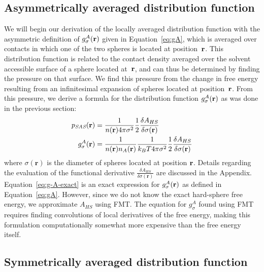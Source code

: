 \subsection{Asymmetrically averaged distribution function}\label{sec:g-A}

We will begin our derivation of the locally averaged distribution
function with the asymmetric definition of $g_\sigma^A(\textbf{r})$ given in
Equation~\ref{eq:gA}, which is averaged over contacts in which one of
the two spheres is located at position~$\textbf{r}$.  This distribution
function is related to the contact density averaged over the solvent accessible surface
of a sphere located at~$\textbf{r}$, and can thus be determined by finding
the pressure on that surface.  We find this pressure from the change in
free energy resulting from an infinitesimal expansion of spheres
located at position~$\textbf{r}$.  From this pressure, we derive a
formula for the distribution function $g_\sigma^A(\textbf{r})$ as was done in
the previous section:
\begin{align}
  p_{\textit{SAS}}(\mathbf{r}) &= \frac{1}{n(\rr) 4\pi \sigma^2}\frac12 \frac{\delta
    A_{HS}}{\delta \sigma(\mathbf{r})} \label{eq:p_{HS}^A}\\
  g_\sigma^A(\rr)%
  &= \frac{1}{n(\rr) n_A(\rr)}\frac{1}{ k_BT 4\pi \sigma^2}\frac12 \frac{\delta
    A_{HS}}{\delta \sigma(\mathbf{r})} \label{eq:g-A-exact}
\end{align}
where $\sigma(\mathbf{r})$ is the diameter of spheres located at position $\textbf{r}$.
Details regarding the evaluation of the functional derivative
$\frac{\delta A_{HS}}{\delta \sigma(\mathbf{r})}$
are discussed in the Appendix.
Equation~\ref{eq:g-A-exact} is an exact expression for
$g_\sigma^A(\textbf{r})$ as defined in Equation~\ref{eq:gA}.  However, since
we do not know the exact hard-sphere free energy, we approximate
$A_{HS}$ using FMT.
The equation for $g_\sigma^A$ found using FMT requires finding
convolutions of local derivatives of the free energy, making this
formulation computationally somewhat more expensive than the free
energy itself.

\derivation{
  \end{widetext}
}

\subsection{Symmetrically averaged distribution function}\label{sec:g-S}

